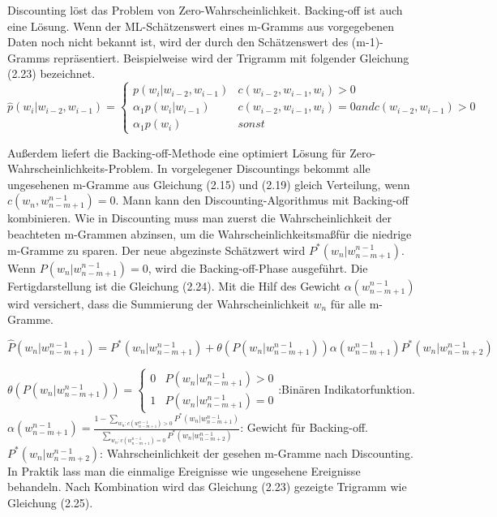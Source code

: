Discounting l\"ost das Problem von Zero-Wahrscheinlichkeit. Backing-off ist auch eine L\"osung. Wenn der ML-Sch\"atzenswert eines m-Gramms aus vorgegebenen Daten noch nicht bekannt ist, wird der durch den Sch\"atzenswert des (m-1)-Gramms repr\"asentiert. Beispielweise wird der Trigramm mit folgender Gleichung (2.23) bezeichnet.
\begin{equation}
\label{equation:backing_off_01}
	\hat{p}(w_{i}|w_{i-2},w_{i-1})=
	\begin{cases}
			p(w_{i}|w_{i-2},w_{i-1}) & c(w_{i-2},w_{i-1},w_{i})>0 \\
			\alpha_{1}p(w_{i}|w_{i-1})& c(w_{i-2},w_{i-1},w_{i})=0 and c(w_{i-2},w_{i-1})>0 \\
			\alpha_{1}p(w_{i}) & sonst 
	\end{cases}
\end{equation}

Au\ss erdem liefert die Backing-off-Methode eine optimiert L\"osung f\"ur Zero-Wahrscheinlichkeits-Problem. In vorgelegener Discountings bekommt alle ungesehenen m-Gramme aus Gleichung (2.15) und (2.19) gleich Verteilung, wenn $c(w_{n},w_{n-m+1}^{n-1})=0$. Mann kann den Discounting-Algorithmus mit Backing-off kombinieren. Wie in Discounting muss man zuerst die Wahrscheinlichkeit der beachteten m-Grammen abzinsen, um die Wahrscheinlichkeitsma\ss f\"ur die niedrige m-Gramme zu sparen. Der neue  abgezinste Sch\"atzwert wird $P^{*}(w_{n}|w_{n-m+1}^{n-1})$. Wenn $P(w_{n}|w_{n-m+1}^{n-1})=0$, wird die Backing-off-Phase ausgef\"uhrt.  Die Fertigdarstellung ist die Gleichung (2.24).  Mit die Hilf des Gewicht $\alpha(w_{n-m+1}^{n-1})$ wird versichert, dass die Summierung der Wahrscheinlichkeit $w_{n}$ f\"ur alle m-Gramme.

\begin{equation}
\label{equation:backing_off_02}
\hat{P}(w_{n}|w_{n-m+1}^{n-1})=P^{*}(w_{n}|w_{n-m+1}^{n-1})+\theta(P(w_{n}|w_{n-m+1}^{n-1}))\alpha(w_{n-m+1}^{n-1})P^{*}(w_{n}|w_{n-m+2}^{n-1})
\end{equation}

$\theta(P(w_{n}|w_{n-m+1}^{n-1}))=\begin{cases} 0 & P(w_{n}|w_{n-m+1}^{n-1})>0 \\ 1 & P(w_{n}|w_{n-m+1}^{n-1})= 0 \end{cases}$:Bin\"aren Indikatorfunktion.\\
$\alpha(w_{n-m+1}^{n-1})=\frac{1-\sum_{w_{n}:c(w_{n-m+1}^{n-1})>0}P^{*}(w_{n}|w_{n-m+1}^{n-1})}{\sum_{w_{n}:c(w_{n-m+1}^{n-1})=0}P^{*}(w_{n}|w_{n-m+2}^{n-1})}$: Gewicht f\"ur Backing-off.\\
$P^{*}(w_{n}|w_{n-m+2}^{n-1})$: Wahrscheinlichkeit der gesehen m-Gramme nach Discounting.\\
In Praktik lass man die einmalige Ereignisse wie ungesehene Ereignisse behandeln. Nach Kombination wird das Gleichung (2.23) gezeigte Trigramm wie Gleichung (2.25).

